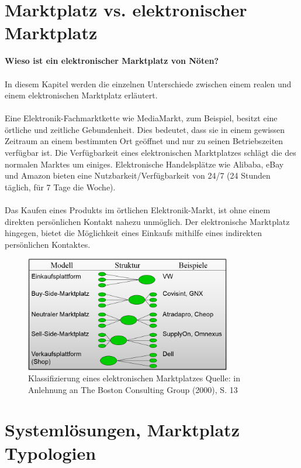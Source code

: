 \documentclass[11pt,a4paper]{article}
\begin{document}
\section{Marktplatz vs. elektronischer Marktplatz}
\textbf{Wieso ist ein elektronischer Marktplatz von Nöten?} \\ \\
In diesem Kapitel werden die einzelnen Unterschiede zwischen einem realen und einem elektronischen Marktplatz erläutert. \\ \\
Eine Elektronik-Fachmarktkette wie MediaMarkt, zum Beispiel, besitzt eine örtliche und zeitliche Gebundenheit. Dies bedeutet, dass sie in einem gewissen Zeitraum an einem bestimmten Ort geöffnet und nur zu seinen Betriebszeiten verfügbar ist. Die Verfügbarkeit eines elektronischen Marktplatzes schlägt die des normalen Marktes um einiges. Elektronische Handelsplätze wie Alibaba, eBay und Amazon bieten eine Nutzbarkeit/Verfügbarkeit von 24/7 (24 Stunden täglich, für 7 Tage die Woche). \\ \\ 
Das Kaufen eines Produkts im örtlichen Elektronik-Markt, ist ohne einem direkten persönlichen Kontakt nahezu unmöglich. Der elektronische Marktplatz hingegen, bietet die Möglichkeit eines Einkaufs mithilfe eines indirekten persönlichen Kontaktes.

\begin{figure}[ht!]
	\centering
	\includegraphics[width=90mm]{classy}
	\caption{Klassifizierung eines elektronischen Marktplatzes \newline Quelle: in Anlehnung an The Boston Consulting Group (2000), S. 13
		 \label{classy}}
\end{figure} 

\newpage

\section{Systemlösungen, Marktplatz Typologien}
\end{document}
